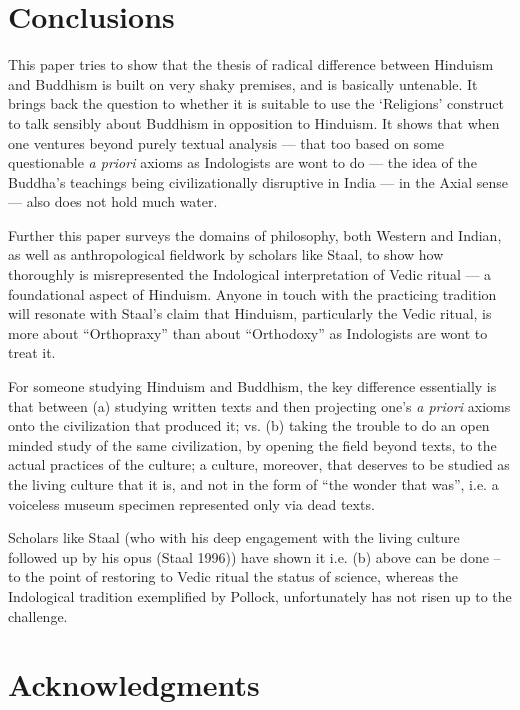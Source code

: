 \vspace{-.3cm}

\section*{Conclusions}

This paper tries to show that the thesis of radical difference between Hinduism and Buddhism is built on very shaky premises, and is basically untenable. It brings back the question to whether it is suitable to use the ‘Religions’ construct to talk sensibly about Buddhism in opposition to Hinduism. It shows that when one ventures beyond purely textual analysis --- that too based on some questionable \textit{a priori} axioms as Indologists are wont to do --- the idea of the Buddha’s teachings being civilizationally disruptive in India --- in the Axial sense --- also does not hold much water.

Further this paper surveys the domains of philosophy, both Western and Indian, as well as anthropological fieldwork by scholars like Staal, to show how thoroughly is misrepresented the Indological interpretation of Vedic ritual --- a foundational aspect of Hinduism. Anyone in touch with the practicing tradition will resonate with Staal’s claim that Hinduism, particularly the Vedic ritual, is more about “Orthopraxy” than about “Orthodoxy” as Indologists are wont to treat it.

For someone studying Hinduism and Buddhism, the key difference essentially is that between (a) studying written texts and then projecting one’s \textit{a priori} axioms onto the civilization that produced it; vs. (b) taking the trouble to do an open minded study of the same civilization, by opening the field beyond texts, to the actual practices of the culture; a culture, moreover, that deserves to be studied as the living culture that it is, and not in the form of “the wonder that was”, i.e. a voiceless museum specimen represented only via dead texts.

Scholars like Staal (who with his deep engagement with the living culture followed up by his opus (Staal 1996)) have shown it i.e. (b) above can be done – to the point of restoring to Vedic ritual the status of science, whereas the Indological tradition exemplified by Pollock, unfortunately has not risen up to the challenge.


\section*{Acknowledgments}

